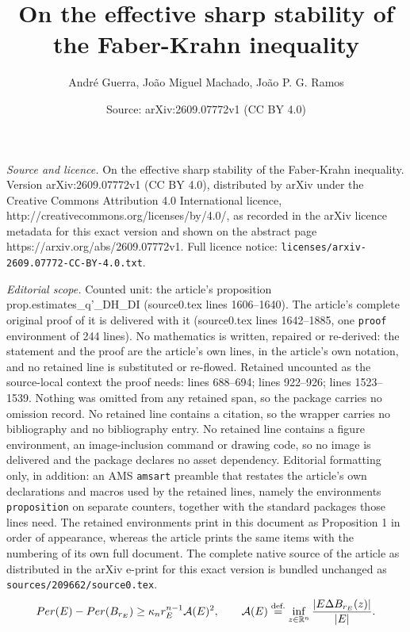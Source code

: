 \documentclass[10pt,a4paper]{amsart}
\title{On the effective sharp stability of the Faber-Krahn inequality}
\author{Andr\'e Guerra, Jo\~ao Miguel Machado, Jo\~ao P. G. Ramos}
\date{Source: arXiv:2609.07772v1 (CC BY 4.0)}
\newcommand\Per{\mathop{\rm Per}}
\newcommand{\eqdef}{\overset{\text{def.}}{=}}
\begin{document}
\maketitle

\noindent\emph{Source and licence.} On the effective sharp stability of the Faber-Krahn inequality. Version arXiv:2609.07772v1 (CC BY 4.0), distributed by arXiv under the Creative Commons Attribution 4.0 International licence, http://creativecommons.org/licenses/by/4.0/, as recorded in the arXiv licence metadata for this exact version and shown on the abstract page https://arxiv.org/abs/2609.07772v1. Full licence notice: \texttt{licenses/arxiv-2609.07772-CC-BY-4.0.txt}.\par\smallskip

\noindent\textit{Editorial scope.} Counted unit: the article's proposition prop.estimates\_q'\_DH\_DI (source0.tex lines 1606--1640). The article's complete original proof of it is delivered with it (source0.tex lines 1642--1885, one \texttt{proof} environment of 244 lines). No mathematics is written, repaired or re-derived: the statement and the proof are the article's own lines, in the article's own notation, and no retained line is substituted or re-flowed.  Retained uncounted as the source-local context the proof needs: lines 688--694; lines 922--926; lines 1523--1539.  Nothing was omitted from any retained span, so the package carries no omission record.  No retained line contains a citation, so the wrapper carries no bibliography and no bibliography entry.  No retained line contains a figure environment, an image-inclusion command or drawing code, so no image is delivered and the package declares no asset dependency.  Editorial formatting only, in addition: an AMS \texttt{amsart} preamble that restates the article's own declarations and macros used by the retained lines, namely the environments \texttt{proposition} on separate counters, together with the standard packages those lines need.  The retained environments print in this document as Proposition 1 in order of appearance, whereas the article prints the same items with the numbering of its own full document.  The complete native source of the article as distributed in the arXiv e-print for this exact version is bundled unchanged as \texttt{sources/209662/source0.tex}.
\begin{equation}\label{eq.quant_isoperimetric}
  \Per(E)-\Per(B_{r_E})
  \ge \kappa_n r_E^{n-1}\mathcal A(E)^2,
  \qquad
  \mathcal A(E)\eqdef
  \inf_{z\in\mathbb R^n}\frac{|E\Delta B_{r_E}(z)|}{|E|}.
\end{equation}
\end{document}
